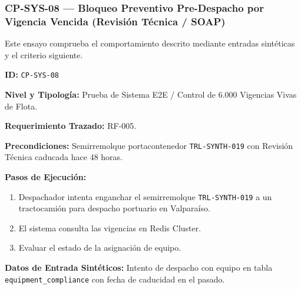 \subsubsection*{CP-SYS-08 — Bloqueo Preventivo Pre-Despacho por Vigencia Vencida (Revisión Técnica / SOAP)}\label{sec:9-cp-sys-08}
Este ensayo comprueba el comportamiento descrito mediante entradas sintéticas y el criterio siguiente.

\par\noindent\textbf{ID:} \texttt{C\allowbreak{}P\allowbreak{}-\allowbreak{}S\allowbreak{}Y\allowbreak{}S\allowbreak{}-\allowbreak{}0\allowbreak{}8\allowbreak{}}\par
\par\noindent\textbf{Nivel y Tipología:} Prueba de Sistema E2E / Control de 6.000 Vigencias Vivas de Flota.\par
\par\noindent\textbf{Requerimiento Trazado:} RF-005.\par
\par\noindent\textbf{Precondiciones:} Semirremolque portacontenedor \texttt{T\allowbreak{}R\allowbreak{}L\allowbreak{}-\allowbreak{}S\allowbreak{}Y\allowbreak{}N\allowbreak{}T\allowbreak{}H\allowbreak{}-\allowbreak{}0\allowbreak{}1\allowbreak{}9\allowbreak{}} con Revisión Técnica caducada hace 48 horas.\par
\par\noindent\textbf{Pasos de Ejecución:} \par
\begin{enumerate}
\item Despachador intenta enganchar el semirremolque \texttt{T\allowbreak{}R\allowbreak{}L\allowbreak{}-\allowbreak{}S\allowbreak{}Y\allowbreak{}N\allowbreak{}T\allowbreak{}H\allowbreak{}-\allowbreak{}0\allowbreak{}1\allowbreak{}9\allowbreak{}} a un tractocamión para despacho portuario en Valparaíso.
\item El sistema consulta las vigencias en Redis Cluster.
\item Evaluar el estado de la asignación de equipo.
\end{enumerate}
\par\noindent\textbf{Datos de Entrada Sintéticos:} Intento de despacho con equipo en tabla \texttt{e\allowbreak{}q\allowbreak{}u\allowbreak{}i\allowbreak{}p\allowbreak{}m\allowbreak{}e\allowbreak{}n\allowbreak{}t\allowbreak{}\_\allowbreak{}c\allowbreak{}o\allowbreak{}m\allowbreak{}p\allowbreak{}l\allowbreak{}i\allowbreak{}a\allowbreak{}n\allowbreak{}c\allowbreak{}e\allowbreak{}} con fecha de caducidad en el pasado.\par
